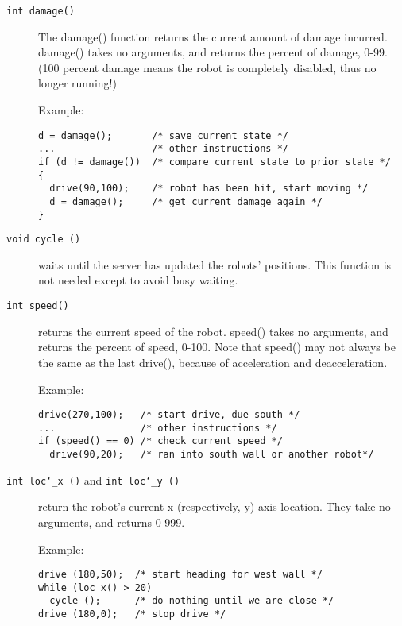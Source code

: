 \documentclass{article}
\def\UL{\char`\_}
\begin{document}
\begin{description}
\item[\texttt{int damage()}]
        The damage() function returns the current amount of damage
        incurred.  damage() takes no arguments, and returns the percent
        of damage, 0-99. (100 percent damage means the robot is
        completely disabled, thus no longer running!) 

        Example:
\begin{verbatim}
d = damage();       /* save current state */
...                 /* other instructions */
if (d != damage())  /* compare current state to prior state */
{
  drive(90,100);    /* robot has been hit, start moving */
  d = damage();     /* get current damage again */
} 
\end{verbatim}

\item[\texttt{void cycle ()}]
        waits until the server has updated the robots' positions.
        This function is not needed except to avoid busy waiting.

\item[\texttt{int speed()}]
        returns the current speed of the robot.
        speed() takes no arguments, and returns the percent of speed,
        0-100.  Note that speed() may not always be the same as the last
        drive(), because of acceleration and deacceleration.

        Example:
\begin{verbatim}
drive(270,100);   /* start drive, due south */
...               /* other instructions */
if (speed() == 0) /* check current speed */
  drive(90,20);   /* ran into south wall or another robot*/
\end{verbatim}

\item[\texttt{int loc\UL x ()} and \texttt{int loc\UL y ()}]
        return the robot's current x (respectively, y) axis location.
        They take no arguments, and returns 0-999.

        Example:
\begin{verbatim}
drive (180,50);  /* start heading for west wall */
while (loc_x() > 20)
  cycle ();      /* do nothing until we are close */
drive (180,0);   /* stop drive */
\end{verbatim}
\end{description}
\end{document}
